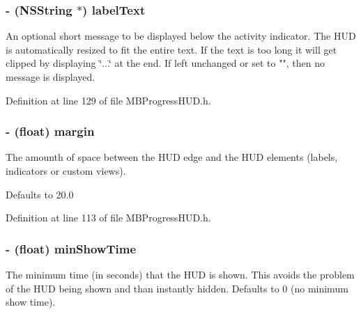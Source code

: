 \hypertarget{interface_m_b_progress_h_u_d_a1d899875abfd1523c91b988113e6ecd1}{
\subsubsection[{labelText}]{\setlength{\rightskip}{0pt plus 5cm}-\/ (NSString $\ast$) labelText}}
\label{interface_m_b_progress_h_u_d_a1d899875abfd1523c91b988113e6ecd1}
An optional short message to be displayed below the activity indicator. The HUD is automatically resized to fit the entire text. If the text is too long it will get clipped by displaying \char`\"{}...\char`\"{} at the end. If left unchanged or set to "", then no message is displayed. 

Definition at line 129 of file MBProgressHUD.h.

\hypertarget{interface_m_b_progress_h_u_d_aea1419deaadb54e70abae7fe5aada09e}{
\subsubsection[{margin}]{\setlength{\rightskip}{0pt plus 5cm}-\/ (float) margin}}
\label{interface_m_b_progress_h_u_d_aea1419deaadb54e70abae7fe5aada09e}
The amounth of space between the HUD edge and the HUD elements (labels, indicators or custom views).

Defaults to 20.0 

Definition at line 113 of file MBProgressHUD.h.

\hypertarget{interface_m_b_progress_h_u_d_a776e5016e02affa05b3748fa6d975fd2}{
\subsubsection[{minShowTime}]{\setlength{\rightskip}{0pt plus 5cm}-\/ (float) minShowTime}}
\label{interface_m_b_progress_h_u_d_a776e5016e02affa05b3748fa6d975fd2}
The minimum time (in seconds) that the HUD is shown. This avoids the problem of the HUD being shown and than instantly hidden. Defaults to 0 (no minimum show time). 

